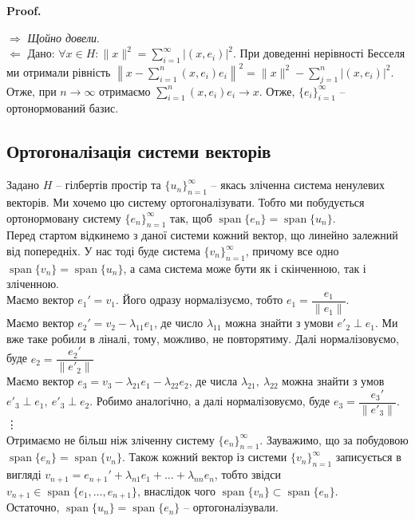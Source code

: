 \documentclass[a4paper, 10pt]{article}
\makeatletter
\def\rightproof{$\boxed{\Rightarrow}$ }
\def\leftproof{$\boxed{\Leftarrow}$ }
\theoremstyle{theoremdd}
\theoremstyle{theoremdd}
\theoremstyle{theoremdd}
\theoremstyle{theoremdd}
\theoremstyle{theoremdd}
\theoremstyle{theoremdd}
\theoremstyle{theoremdd}
\theoremstyle{theoremdd}
\renewenvironment{proof}[1][Proof.\\]{\par
\pushQED{\hfill \qed}%
\normalfont \topsep6\p@\@plus6\p@\relax
\trivlist
\item\relax
{\bfseries
#1\@addpunct{.}}\hspace\labelsep\ignorespaces
}{%
\popQED\endtrivlist\@endpefalse
}
\DeclareMathOperator{\linspan}{span}
\makeatother
\begin{document}
\begin{proof}
\rightproof \textit{Щойно довели}.
\bigskip \\
\leftproof Дано: $\forall x \in H: \|x\|^2 = \displaystyle\sum_{i=1}^\infty |(x,e_i)|^2$. При доведенні нерівності Бесселя ми отримали рівність $\displaystyle\left\| x - \sum_{i=1}^n (x,e_i)e_i \right\|^2 = \|x\|^2 - \sum_{j=1}^n |(x,e_i)|^2$. Отже, при $n \to \infty$ отримаємо $\displaystyle\sum_{i=1}^n (x,e_i)e_i \to x$. Отже, $\{e_i\}_{i=1}^\infty$ -- ортонормований базис.
\end{proof}

\subsection{Ортогоналізація системи векторів}
Задано $H$ -- гілбертів простір та $\{u_n\}_{n=1}^\infty$ -- якась зліченна система ненулевих векторів. Ми хочемо цю систему ортогоналізувати. Тобто ми побудується ортонормовану систему $\{e_n\}_{n=1}^\infty$ так, щоб $\linspan\{e_n\} = \linspan\{u_n\}$.\\
Перед стартом відкинемо з даної системи кожний вектор, що линейно залежний від попередніх. У нас тоді буде система $\{v_n\}_{n=1}^\infty$, причому все одно $\linspan\{v_n\} = \linspan\{u_n\}$, а сама система може бути як і скінченною, так і зліченною.\\
Маємо вектор $e_1' = v_1$. Його одразу нормалізуємо, тобто $e_1 = \dfrac{e_1}{\|e_1\|}$.\\
Маємо вектор $e_2' = v_2 - \lambda_{11} e_1$, де число $\lambda_{11}$ можна знайти з умови $e'_2 \perp e_1$. Ми вже таке робили в ліналі, тому, можливо, не повторятиму. Далі нормалізовуємо, буде $e_2 = \dfrac{e_2'}{\|e'_2\|}$\\
Маємо вектор $e_3 = v_3 - \lambda_{21}e_1 - \lambda_{22}e_2$, де числа $\lambda_{21},\ \lambda_{22}$ можна знайти з умов $e'_3 \perp e_1,\ e'_3 \perp e_2$. Робимо аналогічно, а далі нормалізовуємо, буде $e_3 = \dfrac{e_3'}{\|e'_3\|}$.
\vdots \\
Отримаємо не більш ніж зліченну систему $\{e_n\}_{n=1}^\infty$. Зауважимо, що за побудовою $\linspan\{e_n\} = \linspan\{v_n\}$. Також кожний вектор із системи $\{v_n\}_{n=1}^\infty$ записується в вигляді $v_{n+1} = e_{n+1}' + \lambda_{n1}e_1 + \dots + \lambda_{nn}e_n$, тобто звідси $v_{n+1} \in \linspan\{e_1,\dots,e_{n+1}\}$, внаслідок чого $\linspan\{v_n\} \subset \linspan\{e_n\}$.\\
Остаточно, $\linspan\{u_n\} = \linspan\{e_n\}$ -- ортогоналізували.
\end{document}
